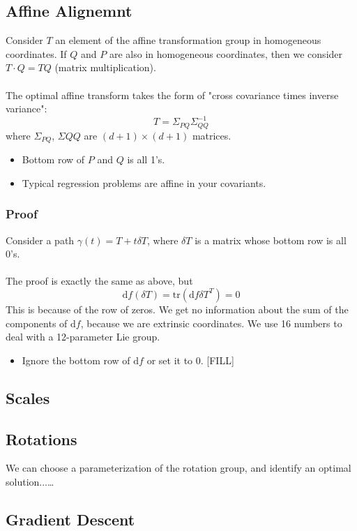 \documentclass[10pt]{article}
\begin{document}
\subsection*{Affine Alignemnt}
Consider $T$ an element of the affine transformation group in homogeneous coordinates.  If $Q$ and $P$ are also in homogeneous coordinates, then we consider $T \cdot Q = TQ$ (matrix multiplication).\\\\
The optimal affine transform takes the form of "cross covariance times inverse variance":
\[T = \Sigma_{PQ} \Sigma_{QQ}^{-1}\]
where $\Sigma_{PQ}$, $\Sigma{QQ}$ are $(d + 1) \times (d + 1)$ matrices.
\begin{itemize}
    \item Bottom row of $P$ and $Q$ is all 1's.
    \item Typical regression problems are affine in your covariants.
\end{itemize}

\subsubsection*{Proof}
Consider a path $\gamma(t) = T + t\delta T$, where $\delta T$ is a matrix whose bottom row is all 0's.\\\\
The proof is exactly the same as above, but
\[\text{d}f (\delta T) = \text{tr} (\text{d}f \delta T^T) = 0\]
This is because of the row of zeros.  We get no information about the sum of the components of $\text{d}f$, because we are extrinsic coordinates.  We use 16 numbers to deal with a 12-parameter Lie group.
\begin{itemize}
    \item Ignore the bottom row of $\text{d}f$ or set it to 0.  [FILL]
\end{itemize}

\subsection*{Scales}

\subsection*{Rotations}
We can choose a parameterization of the rotation group, and identify an optimal solution...\dots

\subsection*{Gradient Descent}
\end{document}
